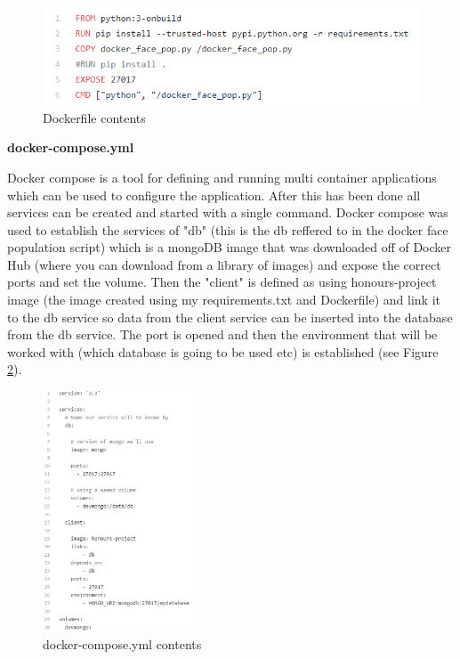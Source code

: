\documentclass[12pt,a4paper]{article}
\begin{document}
\begin{figure}[!ht]
    \centering
    \includegraphics[width=1.0\textwidth]{Figs/Dockerfile.PNG} 
    \caption{Dockerfile contents} 
    \label{Dockerfile}
\end{figure}  

\textbf{docker-compose.yml} 

Docker compose is a tool for defining and running multi container applications which can be used to configure the application. After this has been done all services can be created and started with a single command. Docker compose was used to establish the services of "db" (this is the db reffered to in the docker face population script) which is a mongoDB image that was downloaded off of Docker Hub (where you can download from a library of images) and expose the correct ports and set the volume. Then the "client" is defined as using honours-project image (the image created using my requirements.txt and Dockerfile) and link it to the db service so data from the client service can be inserted into the database from the db service. The port is opened and then the environment that will be worked with (which database is going to be used etc) is established (see Figure \ref{Dockercompose}).  

\begin{figure}[!ht]
    \centering
    \includegraphics[width=0.4\textwidth]{Figs/dockercomposecode.PNG} 
    \caption{docker-compose.yml contents} 
    \label{Dockercompose}
\end{figure}  
\end{document}

